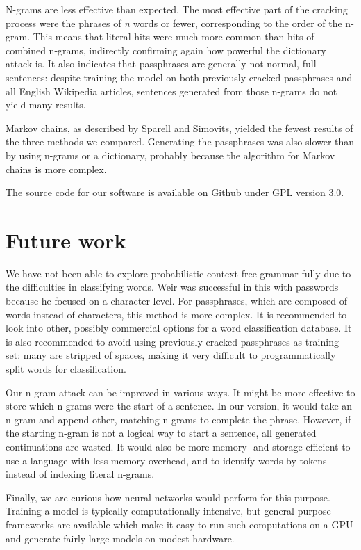 \documentclass{article}
\begin{document}
N-grams are less effective than expected. The most effective part of the
cracking process were the phrases of {\it n} words or fewer, corresponding to
the order of the n-gram. This means that literal hits were much more common
than hits of combined n-grams, indirectly confirming again how powerful the
dictionary attack is. It also indicates that passphrases are generally not
normal, full sentences: despite training the model on both previously cracked
passphrases and all English Wikipedia articles, sentences generated from those
n-grams do not yield many results.

Markov chains, as described by Sparell and Simovits, yielded the fewest results
of the three methods we compared. Generating the passphrases was also slower
than by using n-grams or a dictionary, probably because the algorithm for
Markov chains is more complex.

The source code for our software is available on Github\cite{git} under GPL
version 3.0.


\section{Future work}\label{sec:futurework}

We have not been able to explore probabilistic context-free grammar fully due
to the difficulties in classifying words. Weir was successful in this with
passwords because he focused on a character level. For passphrases, which are
composed of words instead of characters, this method is more complex. It is
recommended to look into other, possibly commercial options for a word
classification database. It is also recommended to avoid using previously
cracked passphrases as training set: many are stripped of spaces, making it
very difficult to programmatically split words for classification.

Our n-gram attack can be improved in various ways. It might be more effective
to store which n-grams were the start of a sentence. In our version, it would
take an n-gram and append other, matching n-grams to complete the phrase.
However, if the starting n-gram is not a logical way to start a sentence, all
generated continuations are wasted. It would also be more memory- and
storage-efficient to use a language with less memory overhead, and to identify
words by tokens instead of indexing literal n-grams.

Finally, we are curious how neural networks would perform for this purpose.
Training a model is typically computationally intensive, but general purpose
frameworks are available which make it easy to run such computations on a GPU
and generate fairly large models on modest hardware.


\newpage
\printbibliography
\end{document}
